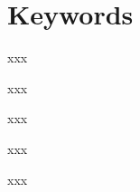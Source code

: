 \section*{Keywords}

{\large %

\noindent xxx

\noindent xxx

\noindent xxx

\noindent xxx

\noindent xxx

}

\vfill


\cleardoublepage

\pagestyle{plain}

 
\def\contentsname{Contents}
\tableofcontents
\newpage

\listoffigures
\newpage

\listoftables

\cleardoublepage

